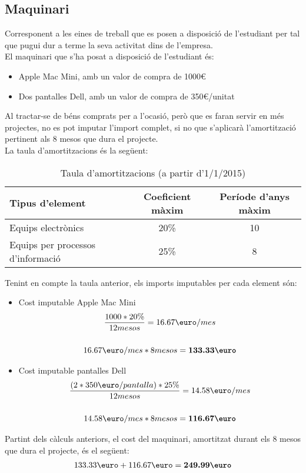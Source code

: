 \subsection{Maquinari}
Corresponent a les eines de treball que es posen a disposició de l'estudiant per tal que pugui dur a terme la seva activitat dins de l'empresa. \\
\newline El maquinari que s'ha posat a disposició de l'estudiant és:
\begin{itemize}
    \item Apple Mac Mini, amb un valor de compra de 1000\euro
    \item Dos pantalles Dell, amb un valor de compra de 350\euro/unitat
\end{itemize}
Al tractar-se de béns comprats per a l'ocasió, però que es faran servir en més projectes, no es pot imputar l'import complet, si no que s'aplicarà l'amortització pertinent als 8 mesos que dura el projecte.\\
\newline La taula d'amortitzacions és la següent:
\begin{table}[h!]
  \centering
  \label{tab:costos}
  \begin{tabular}{l  c  c}
    	\textbf{Tipus d'element} & \textbf{Coeficient màxim} & \textbf{Període d'anys màxim} \\
    	\midrule
    	Equips electrònics & 20\% & 10\\
    	Equips per processos d'informació & 25\% & 8\\ 
    	\bottomrule
  \end{tabular}
  \caption{Taula d'amortitzacions (a partir d'1/1/2015)}
\end{table}
\newline Tenint en compte la taula anterior, els imports imputables per cada element són:
\begin{itemize}
    \item Cost imputable Apple Mac Mini\\
    \begin{gather*}
        \frac{1000 * 20\%}{12 mesos} = 16.67\text{\euro}/mes\\
        \\16.67\text{\euro}/mes * 8 mesos = \textbf{133.33\text{\euro}}
    \end{gather*}
    \item Cost imputable pantalles Dell
    \begin{gather*}
        \frac{(2*350\text{\euro}/pantalla) * 25\%}{12 mesos} = 14.58\text{\euro}/mes\\
        \\14.58\text{\euro}/mes * 8 mesos = \textbf{116.67\text{\euro}} 
    \end{gather*}
\end{itemize}
Partint dels càlculs anteriors, el cost del maquinari, amortitzat durant els 8 mesos que dura el projecte, és el següent:
    \begin{gather*}
        133.33\text{\euro} + 116.67\text{\euro} = \textbf{249.99\text{\euro}}
    \end{gather*}
\clearpage
